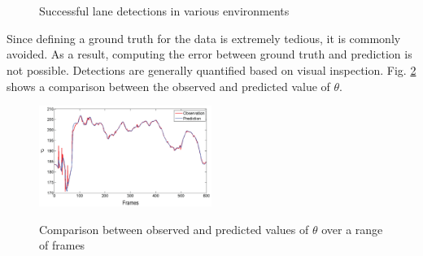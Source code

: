\documentclass{article}
\begin{document}
\begin{figure}[htb!]
  \centering
  \hspace{0.00001in}
  \\
  \hspace{0.00001in}
  \\
  \caption{Successful lane detections in various environments}
  \label{fig:lane_detection}
\end{figure}
Since defining a ground truth for the data is extremely tedious, it is commonly avoided. As a result, computing the error between ground truth and prediction is not possible. Detections are generally quantified based on visual inspection. Fig. \ref{fig:obs_pred_kalman} shows a comparison between the observed and predicted value of $\theta$.
\begin{figure}[htb!]
  \centering
  \includegraphics[width=0.5\textwidth]{IMG/obs_pred_rho_crop.png}\\
  \caption{Comparison between observed and predicted values of $\theta$ over a range of frames}
  \label{fig:obs_pred_kalman}
\end{figure}
\end{document}

